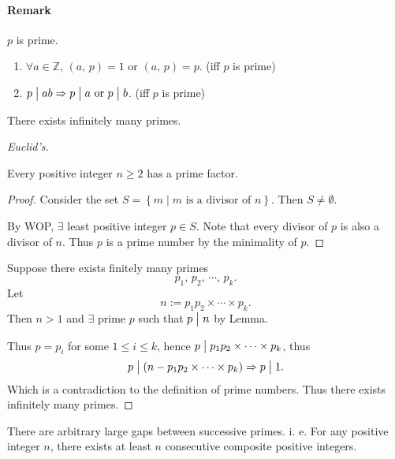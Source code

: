 \paragraph{Remark}
$p$ is prime.

\begin{enumerate}
    \item $\forall a \in \mathbb{Z},\, \left(a,\,p\right) = 1 \mbox{ or } \left(a,\,p\right) = p$. (iff $p$ is prime)
    \item $p \bigm| ab \Rightarrow p \bigm| a \mbox{ or } p \bigm| b$. (iff $p$ is prime)
\end{enumerate}

\begin{theorem}
    There exists infinitely many primes.
\end{theorem}

\begin{proof}[Euclid's]
    \begin{lemma}
        Every positive integer $n \geq 2$ has a prime factor.
    \end{lemma}

    \begin{proof}
        Consider the set $S=\left\{m \mid m\mbox{ is a divisor of }n\right\}$.
        Then $S \neq \emptyset$.

        By WOP, $\exists$ least positive integer $p\in S$. Note that
        every divisor of $p$ is also a divisor of $n$.
        Thus $p$ is a prime number by the minimality of $p$.
    \end{proof}

    Suppose there exists finitely many primes
    \[
        p_1,\,p_2,\,\cdots,\,p_k.    
    \]
    Let
    \[
        n := p_1p_2\times\cdots\times p_k.    
    \]
    Then $n > 1$ and $\exists$ prime $p$ such that $p\bigm| n$ by Lemma.

    Thus $p=p_i$ for some $1 \leq i \leq k$, hence $p \bigm| p_1p_2\times\cdots\times p_k$, thus
    \[
        p \bigm| \left(n-p_1p_2\times\cdots\times p_k\right)
        \Rightarrow p\bigm| 1.
    \]
    Which is a contradiction to the definition of prime numbers. Thus there exists infinitely many primes.
\end{proof}

\begin{theorem}
    There are arbitrary large gaps between successive primes.
    i. e. For any positive integer $n$, there exists at least $n$ consecutive composite
    positive integers.
\end{theorem}


